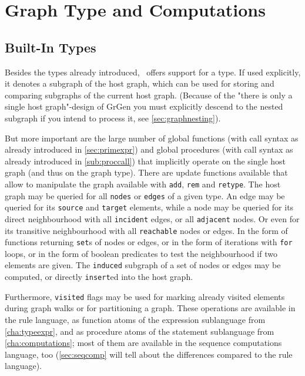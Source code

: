 \chapter{Graph Type and Computations}
\label{cha:graph}


\section{Built-In Types}
\label{sec:builtingenerictypes}
Besides the types already introduced, \GrG\ offers support for a \texttt{} type.
If used explicitly, it denotes a subgraph of the host graph, which can be used for storing and comparing subgraphs of the current host graph. (Because of the "there is only a single host graph"-design of GrGen you must explicitly descend to the nested subgraph if you intend to process it, see \ref{sec:graphnesting}).

But more important are the large number of global functions (with call syntax as already introduced in \ref{sec:primexpr}) and global procedures (with call syntax as already introduced in \ref{sub:proccall}) that implicitly operate on the single host graph (and thus on the graph type).
There are update functions available that allow to manipulate the graph available with \texttt{add}, \texttt{rem} and \texttt{retype}.
The host graph may be queried for all \texttt{nodes} or \texttt{edges} of a given type.
An edge may be queried for its \texttt{source} and \texttt{target} elements,
while a node may be queried for its direct neighbourhood with all \texttt{incident} edges, or all \texttt{adjacent} nodes.
Or even for its transitive neighbourhood with all \texttt{reachable} nodes or edges.
In the form of functions returning \texttt{set}s of nodes or edges, or in the form of iterations with \texttt{for} loops, or in the form of boolean predicates to test the neighbourhood if two elements are given.
The \texttt{induced} subgraph of a set of nodes or edges may be computed, or directly \texttt{insert}ed into the host graph.

Furthermore, \texttt{visited} flags may be used for marking already visited elements during graph walks or for partitioning a graph.
These operations are available in the rule language, as function atoms of the expression sublanguage from \ref{cha:typeexpr}, and as procedure atoms of the statement sublanguage from \ref{cha:computations}; 
most of them are available in the sequence computations language, too
(\ref{sec:seqcomp} will tell about the differences compared to the rule language).

